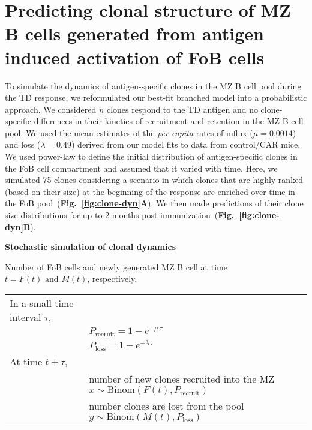 \documentclass[11pt]{article}
\newcommand{\ie}{\textit{i.e.}}
\begin{document}
 
\clearpage


\section*{Predicting clonal structure of MZ B cells generated from antigen induced activation of FoB cells}

To simulate the dynamics of antigen-specific clones in the MZ B cell pool during the TD response, we reformulated our best-fit branched model into a probabilistic approach.
We considered $n$ clones respond to the TD antigen and no clone-specific differences in their kinetics of recruitment and retention in the MZ B cell pool. %
We used the mean estimates of the \textit{per capita} rates of influx ($\mu = 0.0014$) and loss ($\lambda = 0.49$) derived from our model fits to data from control/CAR mice.
We used power-law  to define the initial distribution of antigen-specific clones in the FoB cell compartment and assumed that it varied with time. 
Here, we simulated 75 clones considering a scenario in which clones that are highly ranked (based on their size) at the beginning of the response are enriched over time in the FoB pool~(\textbf{Fig.~\ref{fig:clone-dyn}A}).
We then made predictions of their clone size distributions for up to 2 months post immunization~(\textbf{Fig.~\ref{fig:clone-dyn}B}).



\textbf{Stochastic simulation of clonal dynamics} 

Number of FoB cells and newly generated MZ B cell at time $t = F(t) \text{ and } M(t)$, respectively. 

\begin{tabular}{ll}
In a small time interval $\tau$, \\
&$P_\text{recruit} = 1-e^{-\mu \,\tau} $ \\
&$P_\text{loss} = 1-e^{-\lambda \,\tau} $ \\



At time  $t + \tau$, &\\
&number of new clones recruited into the MZ $x \sim \text{Binom}(F(t), P_\text{recruit})$ \\
&number clones are lost from the pool $y \sim \text{Binom}(M(t), P_\text{loss})$  \\

\end{tabular}
\end{document}

